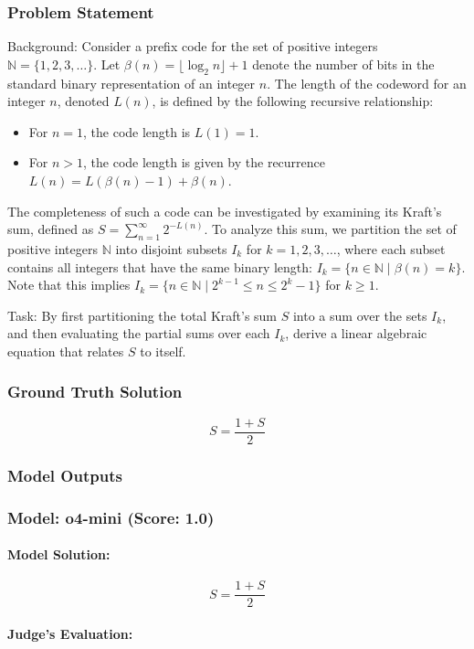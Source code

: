 \documentclass[10pt]{article}
\begin{document}
\subsubsection*{Problem Statement}
Background:
Consider a prefix code for the set of positive integers $\mathbb{N} = \{1, 2, 3, \ldots\}$. Let $\beta(n) = \lfloor \log_2 n \rfloor + 1$ denote the number of bits in the standard binary representation of an integer $n$. The length of the codeword for an integer $n$, denoted $L(n)$, is defined by the following recursive relationship:
\begin{itemize}
    \item For $n=1$, the code length is $L(1) = 1$.
    \item For $n > 1$, the code length is given by the recurrence $L(n) = L(\beta(n)-1) + \beta(n)$.
\end{itemize}
The completeness of such a code can be investigated by examining its Kraft's sum, defined as $S = \sum_{n=1}^{\infty} 2^{-L(n)}$. To analyze this sum, we partition the set of positive integers $\mathbb{N}$ into disjoint subsets $I_k$ for $k=1, 2, 3, \ldots$, where each subset contains all integers that have the same binary length: $I_k = \{ n \in \mathbb{N} \mid \beta(n) = k \}$. Note that this implies $I_k = \{ n \in \mathbb{N} \mid 2^{k-1} \leq n \leq 2^k - 1\}$ for $k \geq 1$.

Task:
By first partitioning the total Kraft's sum $S$ into a sum over the sets $I_k$, and then evaluating the partial sums over each $I_k$, derive a linear algebraic equation that relates $S$ to itself.

\subsubsection*{Ground Truth Solution}
\[ \boxed{S = \frac{1+S}{2}} \]

\subsubsection*{Model Outputs}
\subsubsection*{Model: o4-mini (Score: 1.0)}
\paragraph*{Model Solution:}
\[ S=\frac{1+S}{2} \]

\paragraph*{Judge's Evaluation:}
\end{document}
